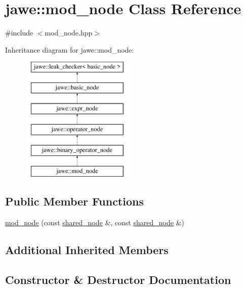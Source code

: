 \hypertarget{classjawe_1_1mod__node}{}\section{jawe\+:\+:mod\+\_\+node Class Reference}
\label{classjawe_1_1mod__node}


{\ttfamily \#include $<$mod\+\_\+node.\+hpp$>$}

Inheritance diagram for jawe\+:\+:mod\+\_\+node\+:\begin{figure}[H]
\begin{center}
\leavevmode
\includegraphics[height=6.000000cm]{classjawe_1_1mod__node}
\end{center}
\end{figure}
\subsection*{Public Member Functions}
\begin{DoxyCompactItemize}
\item 
\hyperlink{classjawe_1_1mod__node_af3a2e686c37c6be678124a02f8f52fa0}{mod\+\_\+node} (const \hyperlink{namespacejawe_a3f307481d921b6cbb50cc8511fc2b544}{shared\+\_\+node} \&, const \hyperlink{namespacejawe_a3f307481d921b6cbb50cc8511fc2b544}{shared\+\_\+node} \&)
\end{DoxyCompactItemize}
\subsection*{Additional Inherited Members}


\subsection{Constructor \& Destructor Documentation}
\mbox{\label{classjawe_1_1mod__node_af3a2e686c37c6be678124a02f8f52fa0}} 
